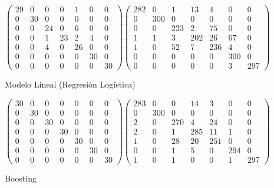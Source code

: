 \documentclass{article}
\begin{document}
	\begin{figure}[H]
	\begin{equation}
		\begin{pmatrix}
			29 & 0 & 0 & 0 & 1 & 0 & 0\\
			0 & 30 & 0 & 0 & 0 & 0 & 0\\
			0 & 0 & 24 & 0 & 6 & 0 & 0\\
			0 & 0 & 1 & 23 & 2 & 4 & 0\\
			0 & 0 & 4 & 0 & 26 & 0 & 0\\
			0 & 0 & 0 & 0 & 0 & 30 & 0\\
			0 & 0 & 0 & 0 & 0 & 0 & 30
		\end{pmatrix}
		\begin{pmatrix}
		282 & 0 & 1 & 13 & 4 & 0 & 0\\
		0 & 300 & 0 & 0 & 0 & 0 & 0\\
		0 & 0 & 223 & 2 & 75 & 0 & 0\\
		1 & 1 & 3 & 202 & 26 & 67 & 0\\
		1 & 0 & 52 & 7 & 236 & 4 & 0\\
		0 & 0 & 0 & 0 & 0 & 300 & 0\\
		0 & 0 & 0 & 0 & 0 & 3 & 297
		\end{pmatrix}
	\end{equation}
	\caption{Modelo Lineal (Regresión Logística)}
	\begin{equation}
	\begin{pmatrix}
	30 & 0 & 0 & 0 & 0 & 0 & 0\\
	0 & 30 & 0 & 0 & 0 & 0 & 0\\
	0 & 0 & 30 & 0 & 0 & 0 & 0\\
	0 & 0 & 0 & 30 & 0 & 0 & 0\\
	0 & 0 & 0 & 0 & 30 & 0 & 0\\
	0 & 0 & 0 & 0 & 0 & 30 & 0\\
	0 & 0 & 0 & 0 & 0 & 0 & 30
	\end{pmatrix}
	\begin{pmatrix}
	283 & 0 & 0 & 14 & 3 & 0 & 0\\
	0 & 300 & 0 & 0 & 0 & 0 & 0\\
	2 & 0 & 270 & 4 & 24 & 0 & 0\\
	2 & 0 & 1 & 285 & 11 & 1 & 0\\
	1 & 0 & 28 & 20 & 251 & 0 & 0\\
	0 & 0 & 1 & 5 & 0 & 294 & 0\\
	1 & 0 & 1 & 0 & 0 & 1 & 297
	\end{pmatrix}
	\end{equation}
	\caption{Boosting}
	

\end{figure}
\end{document}
